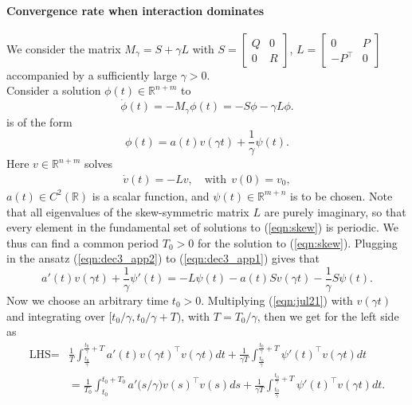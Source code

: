 \documentclass[11pt]{article}
\newcommand{\Rm}{{\mathbb R}}
\newcommand{\1}{\mathds{1}}
\begin{document}
\paragraph{Convergence rate when interaction dominates}
We consider the matrix $M_{\gamma} = S+\gamma L$ with $S = \begin{bmatrix}
            Q & 0\\
            0 &  R
        \end{bmatrix}$,  $L = \begin{bmatrix}
            0 & P\\
            -P^\top &  0
\end{bmatrix}$ accompanied by a sufficiently large $\gamma>0$. \\
Consider a solution $\phi(t)\in\Rm^{n+m}$ to
\begin{equation}\label{eqn:dec3_app1}
    \dot{\phi}(t) = -M_{\gamma} \phi(t) = -S\phi - \gamma L \phi.
\end{equation}
is of the form
\begin{equation}\label{eqn:dec3_app2}
    \phi(t) = a(t)v(\gamma t) + \frac{1}{\gamma} \psi(t).
\end{equation}
Here $v\in \Rm^{n+m}$ solves 
\begin{equation}\label{eqn:skew}
            \begin{aligned}
                \dot{v}(t) = - L v, \quad \text{with}~~v(0) = v_0,
            \end{aligned}
\end{equation}
$a(t)\in C^2(\Rm)$ is a scalar function, and $\psi(t)\in\Rm^{m+n}$ is to be chosen. Note that all eigenvalues of the skew-symmetric matrix $L$ are purely imaginary, so that every element in the fundamental set of solutions to (\ref{eqn:skew}) is periodic. We thus can find a common period $T_0>0$ for the solution to (\ref{eqn:skew}). Plugging in the ansatz (\ref{eqn:dec3_app2}) to (\ref{eqn:dec3_app1}) gives that
\begin{equation}\label{eqn:jul21}
    a'(t)v(\gamma t)+ \frac{1}{\gamma} \psi'(t)= -L\psi(t) -a(t)S v(\gamma t) - \frac{1}{\gamma} S \psi(t).
\end{equation}
Now we choose an arbitrary time $t_0>0$. Multiplying (\ref{eqn:jul21}) with $v(\gamma t)$ and integrating over $[t_0/\gamma, t_0/\gamma+T)$, with $T = T_0/\gamma$, then we get for the left side as
\begin{equation}\label{eqn:lhs}
    \begin{aligned}
        \text{LHS}=&\frac{1}{T}\int_{\frac{t_0}{\gamma}}^{\frac{t_0}{\gamma}+T} a'(t) v(\gamma t)^{\top} v(\gamma t) dt + \frac{1}{\gamma T}\int_{\frac{t_0}{\gamma}}^{\frac{t_0}{\gamma}+T} \psi'(t)^{\top} v(\gamma t) dt\\
        & = \frac{1}{T_0}\int_{t_0}^{t_0+T_0} a'\big(s/\gamma\big)v(s)^{\top} v(s) ds + \frac{1}{\gamma T}\int_{\frac{t_0}{\gamma}}^{\frac{t_0}{\gamma}+T} \psi'(t)^{\top} v(\gamma t) dt.
    \end{aligned}
\end{equation}
\end{document}
